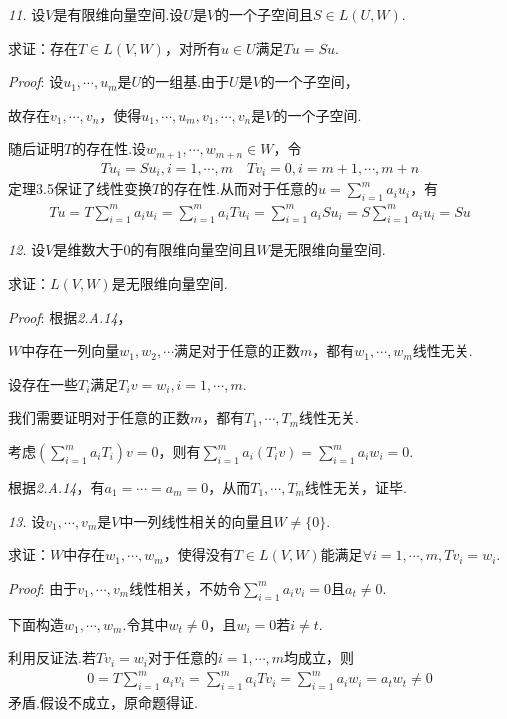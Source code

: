 \textit{11.}
设$V$是有限维向量空间.设$U$是$V$的一个子空间且$S\in L(U,W)$.

求证：存在$T\in L(V,W)$，对所有$u\in U$满足$Tu=Su$.

\textit{Proof}:
设$u_1,\cdots,u_m$是$U$的一组基.由于$U$是$V$的一个子空间，

故存在$v_1,\cdots,v_n$，使得$u_1,\cdots,u_m,v_1,\cdots,v_n$是$V$的一个子空间.

随后证明$T$的存在性.设$w_{m+1},\cdots,w_{m+n} \in W$，令
    \begin{align*}
        Tu_i=Su_i,i=1,\cdots,m \quad Tv_i=0,i=m+1,\cdots,m+n
    \end{align*}
定理3.5保证了线性变换$T$的存在性.从而对于任意的$u=\sum_{i=1}^m a_iu_i$，有
    \begin{align*}
        Tu=T\sum_{i=1}^m a_iu_i=\sum_{i=1}^m a_iTu_i=\sum_{i=1}^m a_iSu_i=S\sum_{i=1}^m a_iu_i=Su
    \end{align*}

\hspace*{\fill}

\textit{12.}
设$V$是维数大于0的有限维向量空间且$W$是无限维向量空间.

求证：$L(V,W)$是无限维向量空间.

\textit{Proof}:
根据\textit{2.A.14}，

$W$中存在一列向量$w_1,w_2,\cdots$满足对于任意的正数$m$，都有$w_1,\cdots,w_m$线性无关.

设存在一些$T_i$满足$T_iv=w_i,i=1,\cdots,m$.

我们需要证明对于任意的正数$m$，都有$T_1,\cdots,T_m$线性无关.

考虑$(\sum_{i=1}^m a_iT_i)v=0$，则有$\sum_{i=1}^m a_i(T_iv)=\sum_{i=1}^m a_iw_i=0$.

根据\textit{2.A.14}，有$a_1=\cdots=a_m=0$，从而$T_1,\cdots,T_m$线性无关，证毕.

\hspace*{\fill}

\textit{13.}
设$v_1,\cdots,v_m$是$V$中一列线性相关的向量且$W \ne \{0\}$.

求证：$W$中存在$w_1,\cdots,w_m$，使得没有$T\in L(V,W)$能满足$\forall i=1,\cdots,m,Tv_i=w_i$.

\textit{Proof}:
由于$v_1,\cdots,v_m$线性相关，不妨令$\sum_{i=1}^m a_iv_i=0$且$a_t \ne 0$.

下面构造$w_1,\cdots,w_m$.令其中$w_t \ne 0$，且$w_i=0$若$i \ne t$.

利用反证法.若$Tv_i=w_i$对于任意的$i=1,\cdots,m$均成立，则
    \begin{align*}
        0=T\sum_{i=1}^m a_iv_i=\sum_{i=1}^m a_iTv_i=\sum_{i=1}^m a_iw_i=a_tw_t \ne 0
    \end{align*}
矛盾.假设不成立，原命题得证.